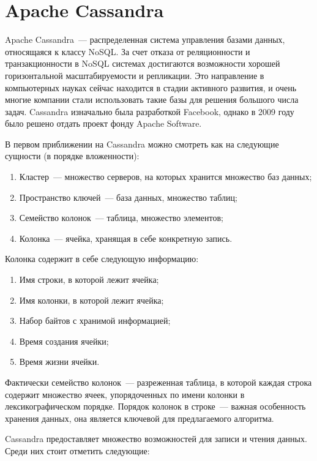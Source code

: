 \section{Apache Cassandra}

Apache Cassandra~--- распределенная система управления базами данных, относящаяся к классу NoSQL. За счет отказа от реляционности и транзакционности в NoSQL системах достигаются возможности хорошей горизонтальной масштабируемости и репликации. Это направление в компьютерных науках сейчас находится в стадии активного развития, и очень многие компании стали использовать такие базы для решения большого числа задач. Cassandra изначально была разработкой Facebook, однако в 2009 году было решено отдать проект фонду Apache Software.

В первом приближении на Cassandra можно смотреть как на следующие сущности (в порядке вложенности):

\begin{enumerate}
	\item Кластер~--- множество серверов, на которых хранится множество баз данных;
	\item Пространство ключей~--- база данных, множество таблиц;
	\item Семейство колонок~--- таблица, множество элементов;
	\item Колонка~--- ячейка, хранящая в себе конкретную запись.
\end{enumerate}

Колонка содержит в себе следующую информацию:

\begin{enumerate}
	\item Имя строки, в которой лежит ячейка;
	\item Имя колонки, в которой лежит ячейка;
	\item Набор байтов с хранимой информацией;
	\item Время создания ячейки;
	\item Время жизни ячейки.
\end{enumerate}

Фактически семейство колонок~--- разреженная таблица, в которой каждая строка содержит множество ячеек, упорядоченных по имени колонки в лексикографическом порядке. Порядок колонок в строке~--- важная особенность хранения данных, она является ключевой для предлагаемого алгоритма.

Cassandra предоставляет множество возможностей для записи и чтения данных. Среди них стоит отметить следующие:

